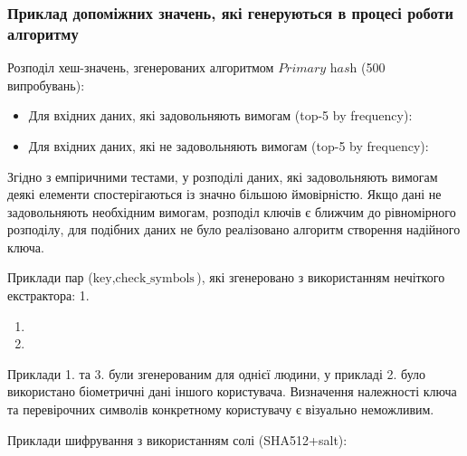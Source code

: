 \documentclass[11pt]{article}
\providecommand{\tightlist}{%
      \setlength{\itemsep}{0pt}\setlength{\parskip}{0pt}}
\begin{document}
    \hypertarget{ux43fux440ux438ux43aux43bux430ux434-ux434ux43eux43fux43eux43cux456ux436ux43dux438ux445-ux437ux43dux430ux447ux435ux43dux44c-ux44fux43aux456-ux433ux435ux43dux435ux440ux443ux44eux442ux44cux441ux44f-ux432-ux43fux440ux43eux446ux435ux441ux456-ux440ux43eux431ux43eux442ux438-ux430ux43bux433ux43eux440ux438ux442ux43cux443}{%
\subsubsection{Приклад допоміжних значень, які генеруються в процесі
роботи
алгоритму}\label{ux43fux440ux438ux43aux43bux430ux434-ux434ux43eux43fux43eux43cux456ux436ux43dux438ux445-ux437ux43dux430ux447ux435ux43dux44c-ux44fux43aux456-ux433ux435ux43dux435ux440ux443ux44eux442ux44cux441ux44f-ux432-ux43fux440ux43eux446ux435ux441ux456-ux440ux43eux431ux43eux442ux438-ux430ux43bux433ux43eux440ux438ux442ux43cux443}}

    Розподіл хеш-значень, згенерованих алгоритмом \(\textit{Primary hash}\)
(500 випробувань):

\begin{itemize}
\tightlist
\item
  Для вхідних даних, які задовольняють вимогам (top-5 by frequency):
\item
  Для вхідних даних, які не задовольняють вимогам (top-5 by frequency):
\end{itemize}

Згідно з емпіричними тестами, у розподілі даних, які задовольняють
вимогам деякі елементи спостерігаються із значно більшою ймовірністю.
Якщо дані не задовольняють необхідним вимогам, розподіл ключів є ближчим
до рівномірного розподілу, для подібних даних не було реалізовано
алгоритм створення надійного ключа.

    Приклади пар (\(\text{key},\text{check_symbols}\)), які згенеровано з
використанням нечіткого екстрактора: 1.

\begin{enumerate}
\def\labelenumi{\arabic{enumi}.}
\setcounter{enumi}{1}
\item
\item
\end{enumerate}

Приклади 1. та 3. були згенерованим для однієї людини, у прикладі 2.
було використано біометричні дані іншого користувача. Визначення
належності ключа та перевірочних символів конкретному користувачу є
візуально неможливим.

    Приклади шифрування з використанням солі (SHA512+salt):
\end{document}
